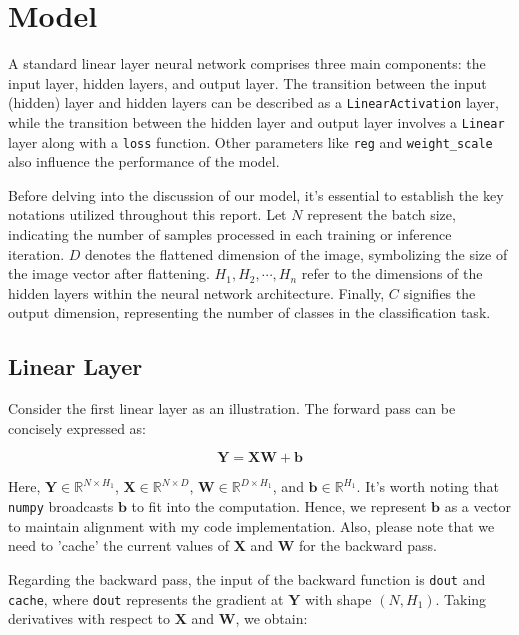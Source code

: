 \documentclass[10pt,a4paper,twoside]{tau}
\renewcommand{\vec}[1]{\mathbf{#1}}
\begin{document}
\section{Model}

A standard linear layer neural network comprises three main components: the input layer, hidden layers, and output layer. The transition between the input (hidden) layer and hidden layers can be described as a \texttt{LinearActivation} layer, while the transition between the hidden layer and output layer involves a \texttt{Linear} layer along with a \texttt{loss} function. Other parameters like \texttt{reg} and \texttt{weight\_scale} also influence the performance of the model.

Before delving into the discussion of our model, it's essential to establish the key notations utilized throughout this report. Let $N$ represent the batch size, indicating the number of samples processed in each training or inference iteration. $D$ denotes the flattened dimension of the image, symbolizing the size of the image vector after flattening. $H_1, H_2, \cdots, H_n$ refer to the dimensions of the hidden layers within the neural network architecture. Finally, $C$ signifies the output dimension, representing the number of classes in the classification task.

\subsection{Linear Layer}

Consider the first linear layer as an illustration. The forward pass can be concisely expressed as:

\begin{equation}
    \vec{Y} = \vec{X}\vec{W} + \vec{b} \tag{3.1.1}
\end{equation}

Here, $\vec{Y} \in \mathbb{R}^{N \times H_1}$, $\vec{X} \in \mathbb{R}^{N \times D}$, $\vec{W} \in \mathbb{R}^{D \times H_1}$, and $\vec{b} \in \mathbb{R}^{H_1}$. It's worth noting that \texttt{numpy} broadcasts $\vec{b}$ to fit into the computation. Hence, we represent $\vec{b}$ as a vector to maintain alignment with my code implementation. Also, please note that we need to 'cache' the current values of $\vec{X}$ and $\vec{W}$ for the backward pass.

Regarding the backward pass, the input of the backward function is \texttt{dout} and \texttt{cache}, where \texttt{dout} represents the gradient at $\vec{Y}$ with shape $(N, H_1)$. Taking derivatives with respect to $\vec{X}$ and $\vec{W}$, we obtain:
\end{document}
